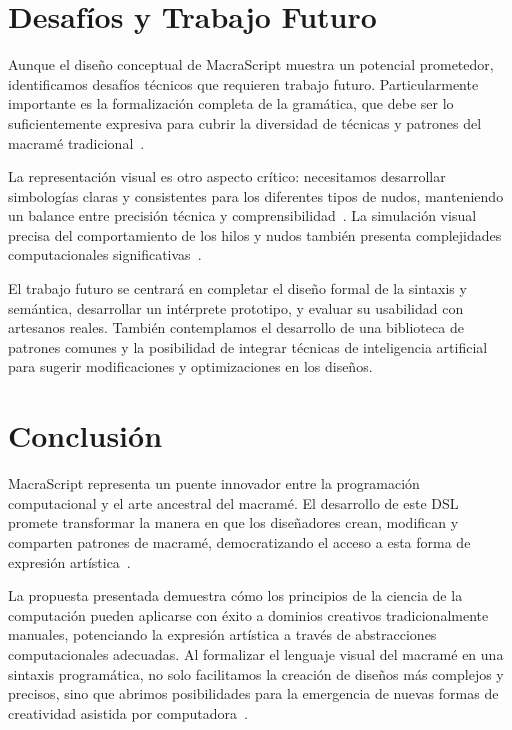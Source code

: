 \documentclass[conference]{IEEEtran}
\begin{document}
\section{Desafíos y Trabajo Futuro}
Aunque el diseño conceptual de MacraScript muestra un potencial prometedor, identificamos desafíos técnicos que requieren trabajo futuro. Particularmente importante es la formalización completa de la gramática, que debe ser lo suficientemente expresiva para cubrir la diversidad de técnicas y patrones del macramé tradicional~\cite{mernik2005}. 

La representación visual es otro aspecto crítico: necesitamos desarrollar simbologías claras y consistentes para los diferentes tipos de nudos, manteniendo un balance entre precisión técnica y comprensibilidad~\cite{hashemi2017}. La simulación visual precisa del comportamiento de los hilos y nudos también presenta complejidades computacionales significativas~\cite{hudson2018}.

El trabajo futuro se centrará en completar el diseño formal de la sintaxis y semántica, desarrollar un intérprete prototipo, y evaluar su usabilidad con artesanos reales. También contemplamos el desarrollo de una biblioteca de patrones comunes y la posibilidad de integrar técnicas de inteligencia artificial para sugerir modificaciones y optimizaciones en los diseños.

\section{Conclusión}
MacraScript representa un puente innovador entre la programación computacional y el arte ancestral del macramé. El desarrollo de este DSL promete transformar la manera en que los diseñadores crean, modifican y comparten patrones de macramé, democratizando el acceso a esta forma de expresión artística~\cite{rochford2019}.

La propuesta presentada demuestra cómo los principios de la ciencia de la computación pueden aplicarse con éxito a dominios creativos tradicionalmente manuales, potenciando la expresión artística a través de abstracciones computacionales adecuadas. Al formalizar el lenguaje visual del macramé en una sintaxis programática, no solo facilitamos la creación de diseños más complejos y precisos, sino que abrimos posibilidades para la emergencia de nuevas formas de creatividad asistida por computadora~\cite{owen1997}.
\end{document}
